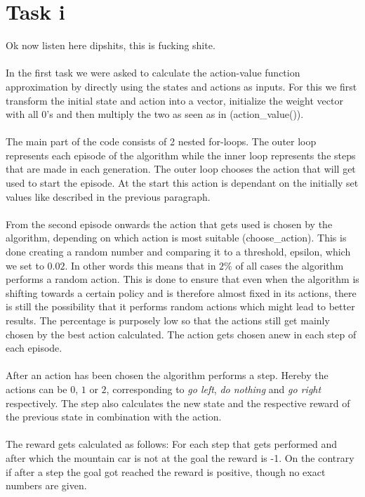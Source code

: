 \documentclass{article}
\begin{document}
	\section{Task i}
	Ok now listen here dipshits, this is fucking shite. \\
	\\
	In the first task we were asked to calculate the action-value function approximation by directly using the states and actions as inputs. For this we first transform the initial state and action into a vector, initialize the weight vector with all 0's and then multiply the two as seen as in (action\_value()). \\
	\\
	The main part of the code consists of 2 nested for-loops. The outer loop represents each episode of the algorithm while the inner loop represents the steps that are made in each generation. The outer loop chooses the action that will get used to start the episode. At the start this action is dependant on the initially set values like described in the previous paragraph. \\
	\\
	From the second episode onwards the action that gets used is chosen by the algorithm, depending on which action is most suitable (choose\_action). This is done creating a random number and comparing it to a threshold, epsilon, which we set to $0.02$. In other words this means that in $2\%$ of all cases the algorithm performs a random action. This is done to ensure that even when the algorithm is shifting towards a certain policy and is therefore almost fixed in its actions, there is still the possibility that it performs random actions which might lead to better results. The percentage is purposely low so that the actions still get mainly chosen by the best action calculated. The action gets chosen anew in each step of each episode. \\
	\\
	After an action has been chosen the algorithm performs a step. Hereby the actions can be $0$, $1$ or $2$, corresponding to \textit{go left}, \textit{do nothing} and \textit{go right} respectively. The step also calculates the new state and the respective reward of the previous state in combination with the action. \\
	\\
	The reward gets calculated as follows: For each step that gets performed and after which the mountain car is not at the goal the reward is -1. On the contrary if after a step the goal got reached the reward is positive, though no exact numbers are given. \\
\end{document}
